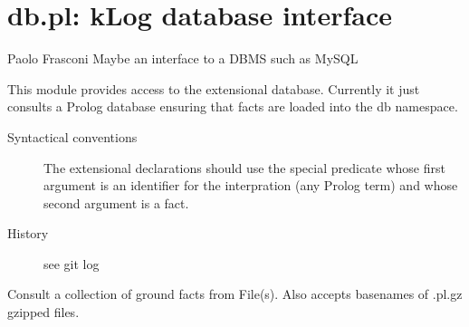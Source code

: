 


\section{db.pl: kLog database interface}

\label{sec:db}

\begin{tags}
Paolo Frasconi
Maybe an interface to a DBMS such as MySQL
\end{tags}

This module provides access to the extensional database. Currently
it just consults a Prolog database ensuring that facts are loaded
into the db namespace.

\begin{description}
    \item[Syntactical conventions] 
The extensional declarations should use the special predicate
 whose first argument is an identifier for the
interpration (any Prolog term) and whose second argument is a fact.
    \item[History] 
see git log
\end{description}

\vspace{0.7cm}

\begin{description}
Consult a collection of ground facts from File(s). Also accepts
basenames of .pl.gz gzipped files.
\end{description}

